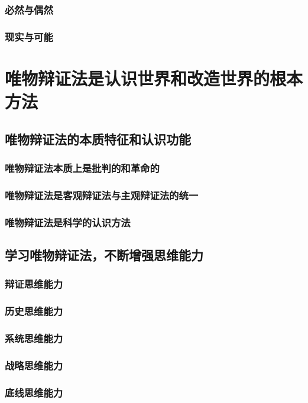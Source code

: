 \documentclass[11pt, UTF8]{book} %
\begin{document}
\subsubsection{必然与偶然}



\newpage
\subsubsection{现实与可能}

\section{唯物辩证法是认识世界和改造世界的根本方法}

\subsection{唯物辩证法的本质特征和认识功能}
\subsubsection{唯物辩证法本质上是批判的和革命的}
\subsubsection{唯物辩证法是客观辩证法与主观辩证法的统一}
\subsubsection{唯物辩证法是科学的认识方法}

\subsection{学习唯物辩证法，不断增强思维能力}
\subsubsection{辩证思维能力}
\subsubsection{历史思维能力}
\subsubsection{系统思维能力}
\subsubsection{战略思维能力}
\subsubsection{底线思维能力}
\end{document}
